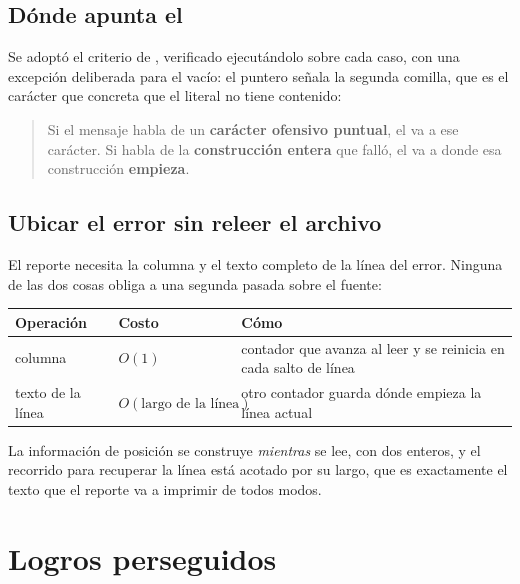 \documentclass[11pt,a4paper]{article}
\begin{document}
\subsection{Dónde apunta el \lex{\caret}}

Se adoptó el criterio de , verificado ejecutándolo sobre cada caso, con una excepción
deliberada para el  vacío: el puntero señala la segunda comilla, que es el carácter
que concreta que el literal no tiene contenido:

\begin{quote}
Si el mensaje habla de un \textbf{carácter ofensivo puntual}, el \lex{\caret} va a ese carácter. Si habla
de la \textbf{construcción entera} que falló, el \lex{\caret} va a donde esa construcción \textbf{empieza}.
\end{quote}

\subsection{Ubicar el error sin releer el archivo}

El reporte necesita la columna y el texto completo de la línea del error. Ninguna de las dos cosas
obliga a una segunda pasada sobre el fuente:

\begin{center}
\begin{tabular}{@{}lll@{}}
\toprule
\textbf{Operación} & \textbf{Costo} & \textbf{Cómo} \\
\midrule
columna & $O(1)$ & contador que avanza al leer y se reinicia en cada salto de línea \\
texto de la línea & $O(\text{largo de la línea})$ & otro contador guarda dónde empieza la línea actual \\
\bottomrule
\end{tabular}
\end{center}

\medskip
La información de posición se construye \emph{mientras} se lee, con dos enteros, y el recorrido para
recuperar la línea está acotado por su largo, que es exactamente el texto que el reporte va a
imprimir de todos modos.

\section{Logros perseguidos}
\end{document}
